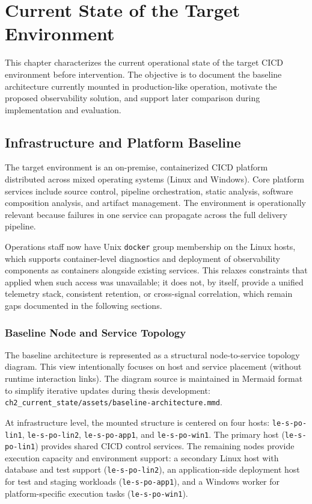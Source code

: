 \chapter{Current State of the Target Environment}
\label{chap:current_state}

This chapter characterizes the current operational state of the target \ac{CICD} environment before intervention. The objective is to document the baseline architecture currently mounted in production-like operation, motivate the proposed observability solution, and support later comparison during implementation and evaluation.

\section{Infrastructure and Platform Baseline}

The target environment is an on-premise, containerized \ac{CICD} platform distributed across mixed operating systems (Linux and Windows). Core platform services include source control, pipeline orchestration, static analysis, software composition analysis, and artifact management. The environment is operationally relevant because failures in one service can propagate across the full delivery pipeline.

Operations staff now have Unix \texttt{docker} group membership on the Linux hosts, which supports container-level diagnostics and deployment of observability components as containers alongside existing services. This relaxes constraints that applied when such access was unavailable; it does not, by itself, provide a unified telemetry stack, consistent retention, or cross-signal correlation, which remain gaps documented in the following sections.

\subsection{Baseline Node and Service Topology}

The baseline architecture is represented as a structural node-to-service topology diagram. This view intentionally focuses on host and service placement (without runtime interaction links). The diagram source is maintained in Mermaid format to simplify iterative updates during thesis development: \texttt{ch2\_current\_state/assets/baseline-architecture.mmd}.

At infrastructure level, the mounted structure is centered on four hosts: \texttt{le-s-po-lin1}, \texttt{le-s-po-lin2}, \texttt{le-s-po-app1}, and \texttt{le-s-po-win1}. The primary host (\texttt{le-s-po-lin1}) provides shared \ac{CICD} control services. The remaining nodes provide execution capacity and environment support: a secondary Linux host with database and test support (\texttt{le-s-po-lin2}), an application-side deployment host for test and staging workloads (\texttt{le-s-po-app1}), and a Windows worker for platform-specific execution tasks (\texttt{le-s-po-win1}).

